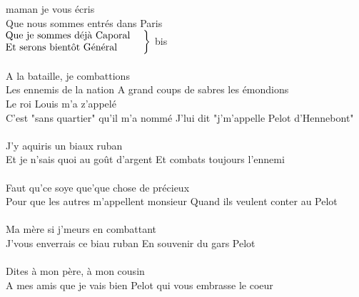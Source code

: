 
 maman je vous écris
\\Que nous sommes entrés dans Paris
\\$\left.\begin{tabular}{l}
\hspace{-0.4cm}
Que je sommes déjà Caporal
\\
\hspace{-0.4cm}
Et serons bientôt Général ~~~~~
\end{tabular}\right\rbrace$ bis
\\\\A la bataille, je combattions 
\\Les ennemis de la nation 
{A grand coups de sabres les émondions ~~~~~~}
\\Le roi Louis m'a z'appelé
\\C'est "sans quartier" qu'il m'a nommé
{J'lui dit "j'm'appelle Pelot d'Hennebont" ~~~~}
\\J'y aquiris un biaux ruban
\\Et je n'sais quoi au goût d'argent
{Et combats toujours l'ennemi ~~~~~~~~~~~~~~~~~~~~}
\\Faut qu'ce soye que'que chose de précieux
\\Pour que les autres m'appellent monsieur
{Quand ils veulent conter au Pelot ~~~~~~~~~~~~~~}
\\Ma mère si j'meurs en combattant
\\J'vous enverrais ce biau ruban
{En souvenir du gars Pelot ~~~~~~~~~~~~~~~~~~~~~~~~~}
\\Dites à mon père, à mon cousin
\\A mes amis que je vais bien
{Pelot qui vous embrasse le coeur ~~~~~~~~~~~~~~~~}
\breakpage